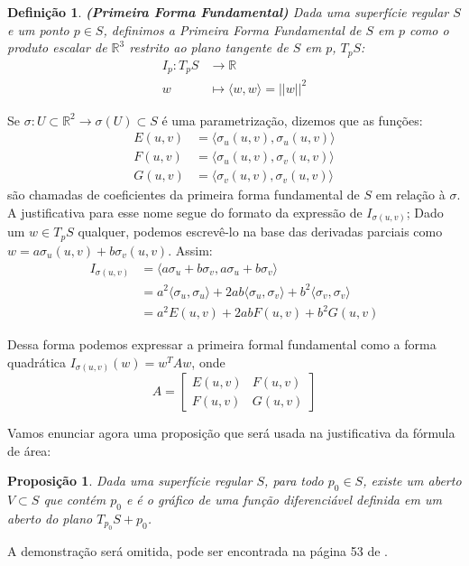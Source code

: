 \documentclass[12pt,letterpaper]{article}
\newtheorem{proposition}{Proposição}
\newtheorem{defi}{Definição}
\newcommand{\real}{\mathbb{R}}
\newcommand{\rr}{\mathbb{R}^2}
\begin{document}
	\begin{defi}
		\textbf{(Primeira Forma Fundamental)\cite{ronaldo}} Dada uma superfície regular $S$ e um ponto $p\in S$, definimos a Primeira Forma Fundamental de $S$ em $p$ como o produto escalar de $\real^3$ restrito ao plano tangente de $S$ em $p$, $T_pS$:
		\begin{align*}
			I_p:T_pS&\to\real\\
			w&\mapsto \langle w,w\rangle=||w||^2
		\end{align*}
	\end{defi}

	Se $\sigma:U\subset\rr\to\sigma(U)\subset S$ é uma parametrização, dizemos que as funções:
	\begin{align*}
		E(u,v)&=\langle \sigma_u(u,v),\sigma_u(u,v)\rangle\\
		F(u,v)&=\langle \sigma_u(u,v),\sigma_v(u,v)\rangle\\
		G(u,v)&=\langle\sigma_v(u,v),\sigma_v(u,v)\rangle
	\end{align*}
	são chamadas de coeficientes da primeira forma fundamental de $S$ em relação à $\sigma$. A justificativa para esse nome segue do formato da expressão de $I_{\sigma(u,v)}$; Dado um $w\in T_pS$ qualquer, podemos escrevê-lo na base das derivadas parciais como $w=a\sigma_u(u,v)+b\sigma_v(u,v)$. Assim:
	\begin{align*}
		I_{\sigma(u,v)}&=\langle a\sigma_u+b\sigma_v,a\sigma_u+b\sigma_v\rangle\\
		&=a^2\langle\sigma_u,\sigma_u\rangle+2ab\langle\sigma_u,\sigma_v\rangle+b^2\langle\sigma_v,\sigma_v\rangle\\
		&=a^2E(u,v)+2abF(u,v)+b^2G(u,v)
	\end{align*}

	Dessa forma podemos expressar a primeira formal fundamental como a forma quadrática $I_{\sigma(u,v)}(w)=w^TAw$, onde 
	$$A=\begin{bmatrix}
		E(u,v)&F(u,v)\\
		F(u,v)&G(u,v)
	\end{bmatrix}$$
	
	Vamos enunciar agora uma proposição que será usada na justificativa da fórmula de área:
	
	\begin{proposition}
		\label{prop1}
		Dada uma superfície regular $S$, para todo $p_0\in S$, existe um aberto $V\subset S$ que contém $p_0$ e é o gráfico de uma função diferenciável definida em um aberto do plano $T_{p_0}S+p_0$.
	\end{proposition}
	 A demonstração será omitida, pode ser encontrada na página 53 de \cite{ronaldo}.
\end{document}

